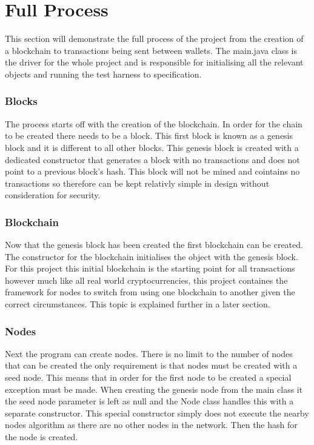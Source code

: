\documentclass{l4proj}
\begin{document}
\section{Full Process}
This section will demonstrate the full process of the project from the creation of a blockchain to transactions
being sent between wallets. The main.java class is the driver for the whole project and is responsible for
initialising all the relevant objects and running the test harness to specification.

\subsubsection{Blocks}
The process starts off with the creation of the blockchain. In order for the chain to be created there needs to be
a block. This first block is known as a genesis block and it is different to all other blocks. This genesis block
is created with a dedicated constructor that generates a block with no transactions and does not point to a previous
block's hash. This block will not be mined and cointains no transactions so therefore can be kept relativly simple
in design without consideration for security. 

\subsubsection{Blockchain}
Now that the genesis block has been created the first blockchain can be created. The constructor for the blockchain
initialises the object with the genesis block. For this project this initial blockchain is the starting point for
all transactions however much like all real world cryptocurrencies, this project containes the framework for 
nodes to switch from using one blockchain to another given the correct circumstances. This topic is explained further
in a later section.

\subsubsection{Nodes}
Next the program can create nodes. There is no limit to the number of nodes that can be created the only 
requirement is that nodes must be created with a seed node. This means that in order for the first node to be created
a special exception must be made. When creating the genesis node from the main class it the seed node parameter
is left as null and the Node class handles this with a separate constructor. This special constructor simply
does not execute the nearby nodes algorithm as there are no other nodes in the network. Then the hash for the 
node is created. 
\end{document}
